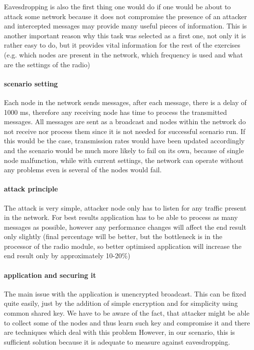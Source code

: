 \documentclass[
  digital, %
  table,   %
  nolof,     %
  nolot,     %
           oneside
]{fithesis3}
\begin{document}
    Eavesdropping is also the first thing one would do if one would be about to attack some network because it does not compromise the presence of an attacker and intercepted messages may provide many useful pieces of information. This is another important reason why this task was selected as a first one, not only it is rather easy to do, but it provides vital information for the rest of the exercises (e.g. which nodes are present in the network, which frequency is used and what are the settings of the radio)

    \paragraph{scenario setting}
    Each node in the network sends messages, after each message, there is a delay of 1000 ms, therefore any receiving node has time to process the transmitted messages. All messages are sent as a broadcast and nodes within the network do not receive nor process them since it is not needed for successful scenario run. If this would be the case, transmission rates would have been updated accordingly and the scenario would be much more likely to fail on its own, because of single node malfunction, while with current settings, the network can operate without any problems even is several of the nodes would fail.

    \paragraph{attack principle}
    The attack is very simple, attacker node only has to listen for any traffic present in the network. For best results application has to be able to process as many messages as possible, however any performance changes will affect the end result only slightly (final percentage will be better, but the bottleneck is in the processor of the radio module, so better optimised application will increase the end result only by approximately 10-20\%)
    \paragraph{application and securing it}
    The main issue with the application is unencrypted broadcast. This can be fixed quite easily, just by the addition of simple encryption and for simplicity using common shared key. We have to be aware of the fact, that attacker might be able to collect some of the nodes and thus learn such key and compromise it and there are techniques which deal with this problem %
    However, in our scenario, this is sufficient solution because it is adequate to measure against eavesdropping.
\end{document}
